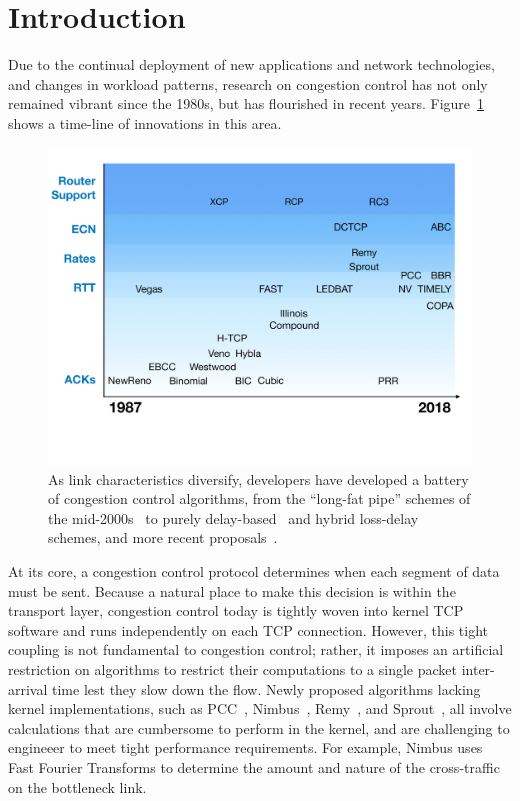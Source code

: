 \section{Introduction}

Due to the continual deployment of new applications and network technologies, and changes in workload patterns, research on congestion control has not only remained vibrant since the 1980s, but has flourished in recent years. Figure~\ref{fig:cctimeline} shows a time-line of innovations in this area.

\begin{figure}[t]
\centering
    \includegraphics[width=\columnwidth]{img/cc-timeline}
    \vspace{-1cm}
    \caption{As link characteristics diversify, developers have developed a battery of congestion control algorithms, from the ``long-fat pipe'' schemes of the mid-2000s~\cite{westwood, veno, htcp, hybla} to purely delay-based~\cite{vegas, fasttcp, ledbat, nv, timely} and hybrid loss-delay~\cite{illinois, compound} schemes, and more recent proposals~\cite{pcc, remy, sprout, bbr, copa, abc}.}\label{fig:cctimeline}
\end{figure}

At its core, a congestion control protocol determines when each segment of data must be sent. Because a natural place to make this decision is within the transport layer, congestion control today is tightly woven into kernel TCP software and runs independently on each TCP connection.
However, this tight coupling is not fundamental to congestion control; rather,
it imposes an artificial restriction on algorithms to restrict their
computations to a single packet inter-arrival time lest they slow down the
flow.
%
Newly proposed algorithms lacking kernel implementations, such as
PCC~\cite{pcc}, Nimbus~\cite{nimbus}, Remy~\cite{remy}, and
Sprout~\cite{sprout}, all involve calculations that are cumbersome to perform in
the kernel, and are challenging to engineeer to meet tight performance
requirements.
%
For example, Nimbus uses Fast Fourier Transforms to determine the amount and
nature of the cross-traffic on the bottleneck link.


